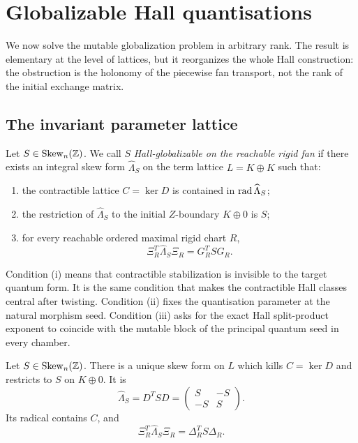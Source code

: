 \section{Globalizable Hall quantisations}
\label{sec:globalization}

We now solve the mutable globalization problem in arbitrary rank.  The result
is elementary at the level of lattices, but it reorganizes the whole Hall
construction: the obstruction is the holonomy of the piecewise fan
transport, not the rank of the initial exchange matrix.

\subsection{The invariant parameter lattice}

\begin{definition}
\label{def:globalizable}
Let $S\in\operatorname{Skew}_n(\mathbb Z)$.  We call $S$ \emph{Hall-globalizable on the
reachable rigid fan} if there exists an integral skew form
$\widehat\Lambda_S$ on the term lattice $L=K\oplus K$ such that:
\begin{enumerate}[label=(\roman*),leftmargin=2.3em]
\item the contractible lattice $C=\ker D$ is contained in
      $\operatorname{rad}\widehat\Lambda_S$;
\item the restriction of $\widehat\Lambda_S$ to the initial
      $Z$-boundary $K\oplus0$ is $S$;
\item for every reachable ordered maximal rigid chart $R$,
      \begin{equation}
       \Xi_R^T\widehat\Lambda_S\Xi_R=G_R^TSG_R.
       \label{eq:globalizable-restriction}
      \end{equation}
\end{enumerate}
\end{definition}

Condition (i) means that contractible stabilization is invisible to the target
quantum form.  It is the same condition that makes the contractible Hall
classes central after twisting.  Condition (ii) fixes the quantisation
parameter at the natural morphism seed.  Condition (iii) asks for the exact
Hall split-product exponent to coincide with the mutable block of the
principal quantum seed in every chamber.

\begin{lemma}
\label{lem:quotient-forced}
Let $S\in\operatorname{Skew}_n(\mathbb Z)$.  There is a unique skew form on $L$ which kills
$C=\ker D$ and restricts to $S$ on $K\oplus0$.  It is
\begin{equation}
 \widehat\Lambda_S=D^TSD
 =\begin{pmatrix}S&-S\\-S&S\end{pmatrix}.
 \label{eq:global-term-form}
\end{equation}
Its radical contains $C$, and
\begin{equation}
 \Xi_R^T\widehat\Lambda_S\Xi_R
 =\Delta_R^TS\Delta_R.
 \label{eq:term-restriction-Delta}
\end{equation}
\end{lemma}

